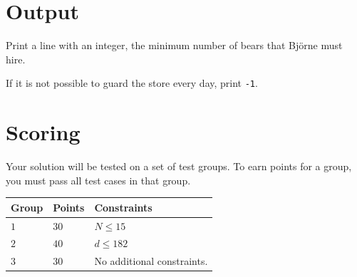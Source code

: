 \section*{Output}
Print a line with an integer, the minimum number of bears that Björne must hire.

If it is not possible to guard the store every day, print \texttt{-1}.

\section*{Scoring}
Your solution will be tested on a set of test groups.
To earn points for a group, you must pass all test cases in that group.

\noindent
\begin{tabular}{| l | l | l |}
\hline
\textbf{Group} & \textbf{Points} & \textbf{Constraints} \\ \hline
$1$   & $30$       & $N \leq 15$ \\ \hline
$2$   & $40$       & $d \leq 182$ \\ \hline
$3$   & $30$       & No additional constraints. \\ \hline
\end{tabular}

